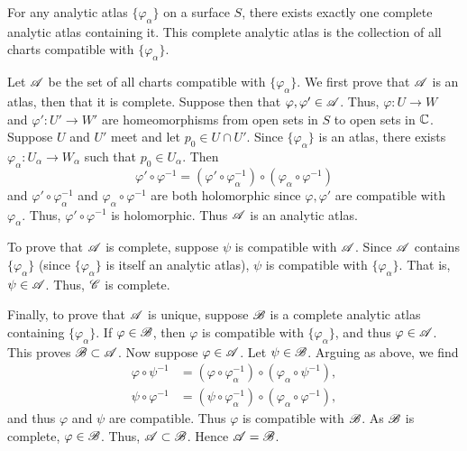 \documentclass[a4paper,11pt]{article}
\begin{document}
\begin{lem}
  \label{lem:1}
  For any analytic atlas $\{\varphi_\alpha\}$ on a surface $S$, there
  exists exactly one complete analytic atlas containing it.  This
  complete analytic atlas is the collection of all charts compatible
  with $\{\varphi_\alpha\}$.
\end{lem}
\begin{myproof}
  Let ${\mathscr{A}}$ be the set of all charts compatible with
  $\{\varphi_\alpha\}$.  We first prove that ${\mathscr{A}}$ is an
  atlas, then that it is complete.  Suppose then that
  $\varphi,\varphi' \in {\mathscr{A}}$. Thus, $\varphi : U\to W$ and
  $\varphi' : U' \to W'$ are homeomorphisms from open sets in $S$ to
  open sets in ${\mathbb C}$. 
  Suppose $U$ and $U'$ meet and let $p_0 \in U\cap U'$.  Since
  $\{\varphi_\alpha\}$ is an atlas, there exists $\varphi_\alpha :
  U_\alpha \to W_\alpha$ such that $p_0 \in U_\alpha$.  Then
  $$
  \varphi' \circ \varphi^{-1} = (\varphi' \circ \varphi_\alpha^{-1})
  \circ (\varphi_\alpha \circ \varphi^{-1})
  $$
  and $\varphi' \circ \varphi_\alpha^{-1}$ and $\varphi_\alpha \circ
  \varphi^{-1}$ are both holomorphic since $\varphi, \varphi'$ are
  compatible with $\varphi_\alpha$.  Thus, $\varphi' \circ
  \varphi^{-1}$ is holomorphic.  Thus ${\mathscr{A}}$ is an analytic
  atlas.

  To prove that ${\mathscr{A}}$ is complete, suppose $\psi$ is compatible with
  ${\mathscr{A}}$.  Since ${\mathscr{A}}$ contains $\{\varphi_\alpha\}$ (since
  $\{\varphi_\alpha\}$ is itself an analytic atlas), $\psi$ is
  compatible with $\{\varphi_\alpha\}$.  That is, $\psi \in {\mathscr{A}}$.
  Thus, ${\mathscr{C}}$ is complete.

  Finally, to prove that ${\mathscr{A}}$ is unique, suppose ${\mathscr{B}}$ is a complete
  analytic atlas containing $\{\varphi_\alpha\}$.  If $\varphi \in
  {\mathscr{B}}$, then $\varphi$ is compatible with $\{\varphi_\alpha\}$, and
  thus $\varphi \in {\mathscr{A}}$.  This proves ${\mathscr{B}}\subset {\mathscr{A}}$.  Now suppose
  $\varphi \in {\mathscr{A}}$.  Let $\psi \in {\mathscr{B}}$.  Arguing as above, we find
  $$
  \begin{aligned}
    \varphi \circ \psi^{-1} &= (\varphi \circ \varphi_\alpha^{-1})
    \circ (\varphi_\alpha \circ \psi^{-1}),\\
    \psi \circ \varphi^{-1} &= (\psi \circ \varphi_\alpha^{-1})
    \circ (\varphi_\alpha \circ \varphi^{-1}),
  \end{aligned}
  $$
  and thus $\varphi$ and $\psi$ are compatible.  Thus $\varphi$ is
  compatible with ${\mathscr{B}}$.  As ${\mathscr{B}}$ is complete, $\varphi \in {\mathscr{B}}$.
  Thus, ${\mathscr{A}}\subset {\mathscr{B}}$.  Hence ${\mathscr{A}} = {\mathscr{B}}$.
\end{myproof}
\end{document}
